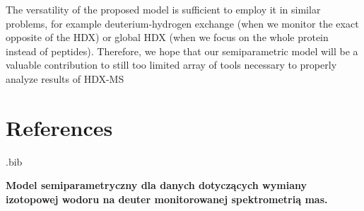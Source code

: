 \documentclass[]{MathAppl18}
\begin{document}
The versatility of the proposed model is sufficient to employ it in similar problems, for example deuterium-hydrogen exchange (when we monitor the exact opposite of the HDX) or global HDX (when we focus on the whole protein instead of peptides). Therefore, we hope that our semiparametric model will be a valuable contribution to still too limited array of tools necessary to properly analyze results of HDX-MS 


 

\section{References}
\nocite{*}
\begin{filecontents}{\jobname.bib}



\end{filecontents}






\bigskip
\setcounter{section}{0}
\Polskitrue
{}

\begin{center}
{\bf Model semiparametryczny dla danych dotyczących wymiany izotopowej wodoru na deuter monitorowanej spektrometrią mas.}\\ 


\end{center}
\medskip

\begin{abstract}
Wymiana wodór-deuter monitorowana spektrometrią mas (HDX-MS) jest jedną z metod badania dynamiki i ukształtowania struktury białek. Podczas inkubacji w ciężkiej wodzie (D2O) reszty aminokwasowe bardziej wystawione na wymianę wodoru na deuter przechodzą ją znacznie szybciej niż inne. Pomiary mas peptydów ujawniają trwałość sieci wiązań wodorowych i regiony z ograniczoną dostępnością rozpuszczalnika. Szybkość wymiany może zależeć od stanu biologicznego białka (np. z lub bez obecnością ligandu) tzn. możebyć powiązana ze zmianami w ukształtowaniu jego struktury. W tym artykule proponujemy test opierający się na mieszanym modelu semiparametrycznym i regresji grzbietowej, który pozwala na dokładną identyfikację peptydów z istotne różnymi prędkościami wymiany w różnych stanach biologicznych. W celu oceny wyników testu, porównaliśmy go z innymi metodami służącymi do analizy danych z eksperymentów HDX-MS.
\end{abstract}
\end{document}
